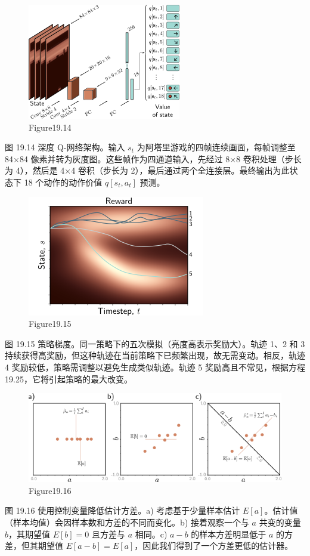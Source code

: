 \begin{figure}[ht!]
\centering
\includegraphics[width=0.7\linewidth]{png/chapter19/ReinforceDQL2.png}
\caption{Figure19.14}
\end{figure}
图 19.14 深度 Q-网络架构。输入 \(s_t\) 为阿塔里游戏的四帧连续画面，每帧调整至 84×84 像素并转为灰度图。这些帧作为四通道输入，先经过 8×8 卷积处理（步长为 4），然后是 4×4 卷积（步长为 2），最后通过两个全连接层。最终输出为此状态下 18 个动作的动作价值 \(q[s_t, a_t]\) 预测。

\begin{figure}[ht!]
\centering
\includegraphics[width=0.7\linewidth]{png/chapter19/ReinforcePolicyGrad.png}
\caption{Figure19.15}
\end{figure}
图 19.15 策略梯度。同一策略下的五次模拟（亮度高表示奖励大）。轨迹 1、2 和 3 持续获得高奖励，但这种轨迹在当前策略下已频繁出现，故无需变动。相反，轨迹 4 奖励较低，策略需调整以避免生成类似轨迹。轨迹 5 奖励高且不常见，根据方程 19.25，它将引起策略的最大改变。

\begin{figure}[ht!]
\centering
\includegraphics[width=0.7\linewidth]{png/chapter19/ReinforcementVariance.png}
\caption{Figure19.16}
\end{figure}
图 19.16 使用控制变量降低估计方差。a) 考虑基于少量样本估计 \(E[a]\)。估计值（样本均值）会因样本数和方差的不同而变化。b) 接着观察一个与 \(a\) 共变的变量 \(b\)，其期望值 \(E[b] = 0\) 且方差与 \(a\) 相同。c) \(a - b\) 的样本方差明显低于 \(a\) 的方差，但其期望值 \(E[a - b] = E[a]\)，因此我们得到了一个方差更低的估计器。

